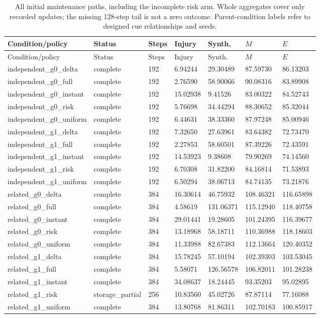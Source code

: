 \begin{longtable}{lllllll}
\caption{All initial maintenance paths, including the incomplete risk arm. Whole aggregates cover only recorded updates; the missing 128-step tail is not a zero outcome. Parent-condition labels refer to designed cue relationships and seeds.}\label{tab:maintenance-initial}\\
\toprule
Condition/policy & Status & Steps & Injury & Synth. & $M$ & $E$ \\
\midrule
\endfirsthead
\toprule
Condition/policy & Status & Steps & Injury & Synth. & $M$ & $E$ \\
\midrule
\endhead
independent\_g0\_delta & complete & 192 & 6.94244 & 29.30489 & 87.59730 & 86.13203 \\
independent\_g0\_full & complete & 192 & 2.76590 & 58.90066 & 90.08316 & 83.89908 \\
independent\_g0\_instant & complete & 192 & 15.02938 & 9.41526 & 83.00322 & 84.52743 \\
independent\_g0\_risk & complete & 192 & 5.76698 & 34.44294 & 88.30652 & 85.32044 \\
independent\_g0\_uniform & complete & 192 & 6.44631 & 38.33360 & 87.97248 & 85.00946 \\
independent\_g1\_delta & complete & 192 & 7.32650 & 27.63961 & 83.64382 & 72.73470 \\
independent\_g1\_full & complete & 192 & 2.27853 & 58.60501 & 87.39226 & 72.43591 \\
independent\_g1\_instant & complete & 192 & 14.53923 & 9.38608 & 79.90269 & 74.14560 \\
independent\_g1\_risk & complete & 192 & 6.70308 & 31.82200 & 84.16814 & 71.53893 \\
independent\_g1\_uniform & complete & 192 & 6.50294 & 38.06713 & 84.74135 & 73.21876 \\
related\_g0\_delta & complete & 384 & 16.30614 & 46.75932 & 108.46321 & 116.65898 \\
related\_g0\_full & complete & 384 & 4.58619 & 131.06371 & 115.12940 & 118.40758 \\
related\_g0\_instant & complete & 384 & 29.01441 & 19.28605 & 101.24395 & 116.39677 \\
related\_g0\_risk & complete & 384 & 13.18968 & 58.18711 & 110.36988 & 118.18603 \\
related\_g0\_uniform & complete & 384 & 11.33988 & 82.67383 & 112.13664 & 120.40352 \\
related\_g1\_delta & complete & 384 & 15.78245 & 57.10194 & 102.39303 & 103.53045 \\
related\_g1\_full & complete & 384 & 5.58071 & 126.56578 & 106.82011 & 101.28238 \\
related\_g1\_instant & complete & 384 & 34.08637 & 18.24445 & 93.35203 & 95.02895 \\
related\_g1\_risk & storage\_partial & 256 & 10.83560 & 45.02726 & 87.87114 & 77.16088 \\
related\_g1\_uniform & complete & 384 & 13.80768 & 81.86311 & 102.70183 & 100.85917 \\
\bottomrule
\end{longtable}
